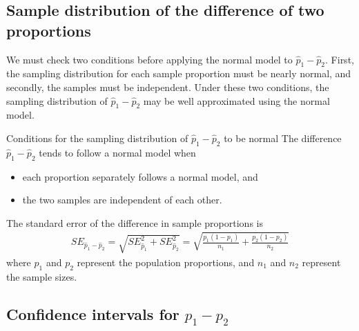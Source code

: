 \subsection{Sample distribution of the difference of two proportions}

We must check two conditions before applying the
normal model to $\hat{p}_1 - \hat{p}_2$.
First, the sampling distribution for each sample
proportion must be nearly normal, and secondly,
the samples must be independent.
Under these two conditions, the sampling distribution
of $\hat{p}_1 - \hat{p}_2$ may be well approximated
using the normal model.

\begin{onebox}{Conditions for the
    sampling distribution of $\hat{p}_1 - \hat{p}_2$
    to be normal}
  The difference $\hat{p}_1 - \hat{p}_2$ tends to
  follow a normal model when
  \begin{itemize}
  \setlength{\itemsep}{0mm}
  \item each proportion separately follows a normal model, and
  \item the two samples are independent of each other.
  \end{itemize}
  The standard error of the difference in sample proportions is
  \begin{eqnarray*}
  SE_{\hat{p}_1 - \hat{p}_2}
    = \sqrt{SE_{\hat{p}_1}^2 + SE_{\hat{p}_2}^2}
    = \sqrt{\frac{p_1(1-p_1)}{n_1} + \frac{p_2(1-p_2)}{n_2}}
  \label{seForDiffOfProp}
  \end{eqnarray*}
  where $p_1$ and $p_2$ represent the population proportions,
  and $n_1$ and $n_2$ represent the sample sizes.
\end{onebox}



\subsection{Confidence intervals for $p_1 -p_2$}

